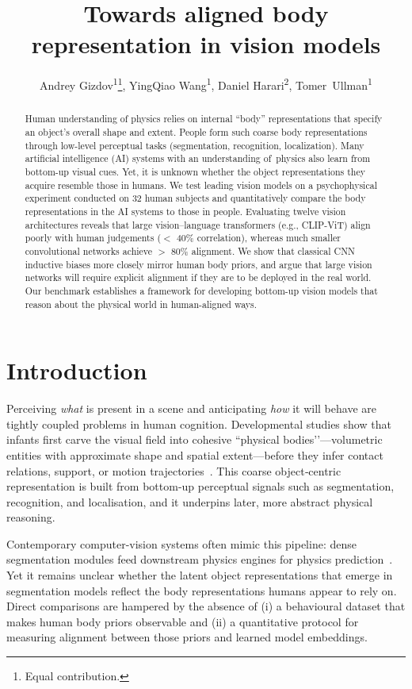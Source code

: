 \documentclass[letterpaper]{article} %
\title{Towards aligned body representation in vision models}
\author{
    Andrey Gizdov\textsuperscript{\rm 1}\thanks{Equal contribution.},
    YingQiao Wang\textsuperscript{\rm 1}\footnotemark[1],
    Daniel Harari\textsuperscript{\rm 2},
    Tomer~Ullman\textsuperscript{\rm 1}
}
\begin{document}
\maketitle

\begin{abstract}
Human understanding of physics relies on internal “body” representations that specify an object’s overall shape and extent. People form such coarse body representations through low-level perceptual tasks (segmentation, recognition, localization). Many artificial intelligence (AI) systems with an understanding of physics also learn from bottom-up visual cues. Yet, it is unknown whether the object representations they acquire resemble those in humans. We test leading vision models on a psychophysical experiment conducted on 32 human subjects and quantitatively compare the body representations in the AI systems to those in people. Evaluating twelve vision architectures reveals that large vision–language transformers (e.g., CLIP-ViT) align poorly with human judgements ($<$ 40\% correlation), whereas much smaller convolutional networks achieve $>$ 80\% alignment. We show that classical CNN inductive biases more closely mirror human body priors, and argue that large vision networks will require explicit alignment if they are to be deployed in the real world. Our benchmark establishes a framework for developing bottom-up vision models that reason about the physical world in human-aligned ways.
\end{abstract}

\section{Introduction}

Perceiving \emph{what} is present in a scene and anticipating \emph{how} it will behave are tightly coupled problems in human cognition.  Developmental studies show that infants first carve the visual field into cohesive “physical bodies’’—volumetric entities with approximate shape and spatial extent—before they infer contact relations, support, or motion trajectories~\cite{spelke1990principles, baillargeon2004infant}.  This coarse object‐centric representation is built from bottom-up perceptual signals such as segmentation, recognition, and localisation, and it underpins later, more abstract physical reasoning.

Contemporary computer-vision systems often mimic this pipeline: dense segmentation modules feed downstream physics engines for physics prediction~\cite{battaglia2013simulation, li2022probabilistic}.  Yet it remains unclear whether the latent object representations that emerge in segmentation models reflect the body representations humans appear to rely on.  Direct comparisons are hampered by the absence of (i) a behavioural dataset that makes human body priors observable and (ii) a quantitative protocol for measuring alignment between those priors and learned model embeddings.
\end{document}
